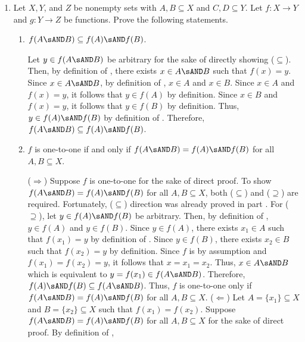 \begin{enumerate}
  \newpage
  \item Let $X, Y$, and $Z$ be nonempty sets with $A, B \subseteq X$ and $C, D \subseteq Y$. 
  Let $f: X \rightarrow Y$ and $g: Y \rightarrow Z$ be functions. 
  Prove the following statements.
  \begin{enumerate}
    \item $f(A \sAND B) \subseteq f(A) \sAND f(B)$. \label{prob:4a}
    \begin{subprove}
      Let $y \in f(A \sAND B)$ be arbitrary for the sake of directly showing ($\subseteq$). 
      Then, by definition of , there exists $x \in A \sAND B$ such that $f(x) = y$.
      Since $x \in A \sAND B$, by definition of , $x \in A$ and $x \in B$.
      Since $x \in A$ and $f(x) = y$, it follows that $y \in f(A)$ by definition.
      Since $x \in B$ and $f(x) = y$, it follows that $y \in f(B)$ by definition.
      Thus, $y \in f(A) \sAND f(B)$ by definition of .
      Therefore, $f(A \sAND B) \subseteq f(A) \sAND f(B)$.
    \end{subprove}
    \item $f$ is one-to-one if and only if $f(A \sAND B)=f(A) \sAND f(B)$ for all $A, B \subseteq X$.
    \begin{subprove}
      ($\Rightarrow$) Suppose $f$ is one-to-one for the sake of direct proof. 
      To show $f(A \sAND B)=f(A) \sAND f(B)$ for all $A, B \subseteq X$, 
      both ($\subseteq$) and ($\supseteq$) are required.
      Fortunately, ($\subseteq$) direction was already proved in part .\proofstep
      For ($\supseteq$), let $y \in f(A) \sAND f(B)$ be arbitrary. 
      Then, by definition of , $y \in f(A)$ and $y \in f(B)$.
      Since $y \in f(A)$, there exists $x_1 \in A$ such that $f(x_1) = y$ by definition of .
      Since $y \in f(B)$, there exists $x_2 \in B$ such that $f(x_2) = y$ by definition.
      Since $f$ is  by assumption and $f(x_1) = f(x_2) = y$, it follows that $x=x_1 = x_2$.
      Thus, $x \in A \sAND B$ which is equivalent to $y = f(x_1) \in f(A \sAND B)$.
      Therefore, $f(A) \sAND f(B) \subseteq f(A \sAND B)$.\proofstep
      Thus, $f$ is one-to-one only if $f(A \sAND B)=f(A) \sAND f(B)$ for all $A, B \subseteq X$.\proofstep
      ($\Leftarrow$) Let $A = \{x_1\} \subseteq X$ and $B = \{x_2\} \subseteq X$ such that $f(x_1) = f(x_2)$.
      Suppose $f(A \sAND B)=f(A) \sAND f(B)$ for all $A, B \subseteq X$ for the sake of direct proof.
      By definition of ,

\end{subprove}
\end{enumerate}
\end{enumerate}
